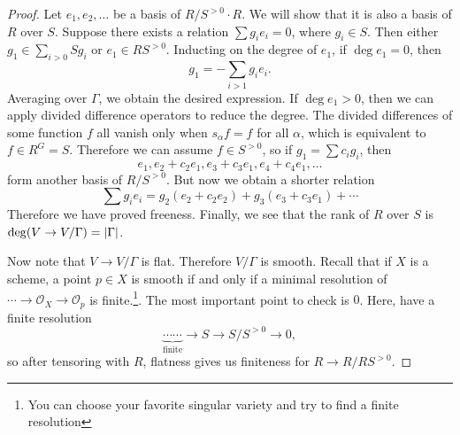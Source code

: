 \documentclass[leqno, openany]{memoir}
\theoremstyle{definition}
\theoremstyle{remark}
\theoremstyle{plain}
\theoremstyle{definition}
\theoremstyle{remark}
\newcommand{\msc}[1]{\mathscr{#1}}
\begin{document}
\begin{proof}
    Let $e_1, e_2, \ldots$ be a basis of $R/S^{>0} \cdot R$. We will show that it is also a basis of $R$ over $S$. Suppose there exists a relation $\sum g_i e_i = 0$, where $g_i \in S$. Then either $g_1 \in \sum_{i > 0} S g_i$ or $e_1 \in RS^{>0}$. Inducting on the degree of $e_1$, if $\deg e_1 = 0$, then
    \[ g_1 = - \sum_{i > 1} g_i e_i. \]
    Averaging over $\Gamma$, we obtain the desired expression. If $\deg e_1 > 0$, then we can apply divided difference operators to reduce the degree. The divided differences of some function $f$ all vanish only when $s_{\alpha} f = f$ for all $\alpha$, which is equivalent to $f \in R^G = S$. Therefore we can assume $f \in S^{>0}$, so if $g_1 = \sum c_i g_i$, then
    \[ e_1, e_2 + c_2 e_1, e_3 + c_3 e_1, e_4 + c_4 e_1, \ldots \]
    form another basis of $R/S^{>0}$. But now we obtain a shorter relation
    \[ \sum g_i e_i = g_2 (e_2 + c_2 e_2) + g_3(e_3 + c_3 e_1) + \cdots \]
    Therefore we have proved freeness. Finally, we see that the rank of $R$ over $S$ is $\deg (V \to V/\Gamma) = \abs{\Gamma}$.

    Now note that $V \to V/\Gamma$ is flat. Therefore $V/\Gamma$ is smooth. Recall that if $X$ is a scheme, a point $p \in X$ is smooth if and only if a minimal resolution of $\cdots \to \msc{O}_X \to \msc{O}_p$ is finite.\footnote{You can choose your favorite singular variety and try to find a finite resolution}. The most important point to check is $0$. Here, have a finite resolution
    \[ \underbrace{\cdots \cdots}_{\text{finite}} \to S \to S/S^{>0} \to 0, \]
    so after tensoring with $R$, flatness gives us finiteness for $R \to R/RS^{>0}$.


\end{proof}
\end{document}

